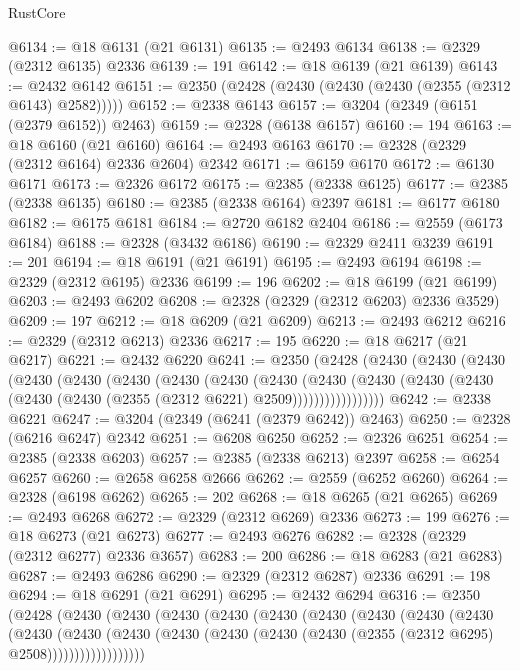 \begin{lexlean}{RustCore}
\begin{coremodule}
@6134 := @18 @6131 (@21 @6131)
@6135 := @2493 @6134
@6138 := @2329 (@2312 @6135) @2336
@6139 := 191
@6142 := @18 @6139 (@21 @6139)
@6143 := @2432 @6142
@6151 := @2350 (@2428 (@2430 (@2430 (@2430 (@2355 (@2312 @6143) @2582)))))
@6152 := @2338 @6143
@6157 := @3204 (@2349 (@6151 (@2379 @6152)) @2463)
@6159 := @2328 (@6138 @6157)
@6160 := 194
@6163 := @18 @6160 (@21 @6160)
@6164 := @2493 @6163
@6170 := @2328 (@2329 (@2312 @6164) @2336 @2604) @2342
@6171 := @6159 @6170
@6172 := @6130 @6171
@6173 := @2326 @6172
@6175 := @2385 (@2338 @6125)
@6177 := @2385 (@2338 @6135)
@6180 := @2385 (@2338 @6164) @2397
@6181 := @6177 @6180
@6182 := @6175 @6181
@6184 := @2720 @6182 @2404
@6186 := @2559 (@6173 @6184)
@6188 := @2328 (@3432 @6186)
@6190 := @2329 @2411 @3239
@6191 := 201
@6194 := @18 @6191 (@21 @6191)
@6195 := @2493 @6194
@6198 := @2329 (@2312 @6195) @2336
@6199 := 196
@6202 := @18 @6199 (@21 @6199)
@6203 := @2493 @6202
@6208 := @2328 (@2329 (@2312 @6203) @2336 @3529)
@6209 := 197
@6212 := @18 @6209 (@21 @6209)
@6213 := @2493 @6212
@6216 := @2329 (@2312 @6213) @2336
@6217 := 195
@6220 := @18 @6217 (@21 @6217)
@6221 := @2432 @6220
@6241 := @2350
    (@2428
      (@2430
        (@2430
          (@2430
            (@2430
              (@2430
                (@2430
                  (@2430
                    (@2430
                      (@2430
                        (@2430
                          (@2430
                            (@2430 (@2430 (@2430 (@2430 (@2355 (@2312 @6221) @2509)))))))))))))))))
@6242 := @2338 @6221
@6247 := @3204 (@2349 (@6241 (@2379 @6242)) @2463)
@6250 := @2328 (@6216 @6247) @2342
@6251 := @6208 @6250
@6252 := @2326 @6251
@6254 := @2385 (@2338 @6203)
@6257 := @2385 (@2338 @6213) @2397
@6258 := @6254 @6257
@6260 := @2658 @6258 @2666
@6262 := @2559 (@6252 @6260)
@6264 := @2328 (@6198 @6262)
@6265 := 202
@6268 := @18 @6265 (@21 @6265)
@6269 := @2493 @6268
@6272 := @2329 (@2312 @6269) @2336
@6273 := 199
@6276 := @18 @6273 (@21 @6273)
@6277 := @2493 @6276
@6282 := @2328 (@2329 (@2312 @6277) @2336 @3657)
@6283 := 200
@6286 := @18 @6283 (@21 @6283)
@6287 := @2493 @6286
@6290 := @2329 (@2312 @6287) @2336
@6291 := 198
@6294 := @18 @6291 (@21 @6291)
@6295 := @2432 @6294
@6316 := @2350
    (@2428
      (@2430
        (@2430
          (@2430
            (@2430
              (@2430
                (@2430
                  (@2430
                    (@2430
                      (@2430
                        (@2430
                          (@2430
                            (@2430
                              (@2430
                                (@2430 (@2430 (@2430 (@2355 (@2312 @6295) @2508))))))))))))))))))

\end{coremodule}
\end{lexlean}
